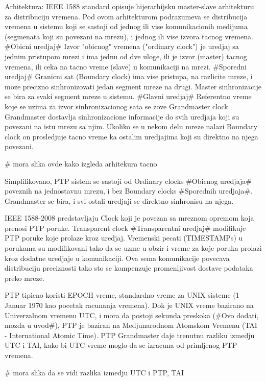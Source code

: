 \documentclass[a4paper,12pt, master]{etf}
\begin{document}
	Arhitektura:
	IEEE 1588 standard opisuje hijerarhijsku master-slave arhitekturu za distribuciju vremena. 
	Pod	ovom arhitekturom podrazumeva se distribucija vremena u sistemu koji se sastoji od 
	jednog ili vise komunikacionih medijuma (segmenata koji su povezani na mrezu), i jednog 
	ili vise izvora	tacnog vremena. \#Obicni uredjaj\# Izvor "obicnog" vremena ("ordinary 
	clock") je uredjaj sa jednim pristupom mrezi i ima jednu od dve uloge, ili je izvor  
	(master) tacnog vremena, ili ceka na tacno vreme (slave) u komunikaciji na mrezi. 
	\#Sporedni uredjaj\# Granicni sat (Boundary	clock) ima vise pristupa, na razlicite mreze, 
	i moze precizno sinhronizovati jedan segment mreze na drugi. Master sinhronizacije se bira 
	za svaki segment mreze u sistemu. \#Glavni	uredjaj\# Referentno vreme koje se uzima za 
	izvor sinhronizacionog sata se zove Grandmaster	clock. Grandmaster dostavlja 
	sinhronizacione informacije do svih uredjaja koji su povezani na istu mrezu sa njim. 
	Ukoliko se u nekom delu mreze nalazi Boundary clock on prosledjuje tacno vreme ka ostalim 
	uredjajima koji su direktno na njega povezani.

	\# mora slika ovde kako izgleda arhitekura tacno

	Simplifikovano, PTP sistem se sastoji od Ordinary clocks \#Obicnog uredjaja\# poveznih na
	jednostavnu mrezu, i bez Boundary clocks \#Sporednih uredjaja\#. Grandmaster se bira, i svi
	ostali uredjaji se direktno sinhronisu na njega.

	IEEE 1588-2008 predstavljaju Clock koji je povezan sa mreznom opremom koja prenosi PTP 
	poruke.	Transparent clock \#Transparentni uredjaj\# modifikuje PTP poruke koje prolaze 
	kroz uredjaj. Vremenski pecati (TIMESTAMPs) u porukama su modifikovani tako da se uzme u 
	obzir i vreme za koje poruka prolazi kroz dodatne uredjaje u komunikaciji. Ova sema 
	komunikacije povecava distribuciju preciznosti tako sto se kompenzuje promenljivost 
	dostave podataka preko mreze.

	PTP tipicno koristi EPOCH vreme, standardno vreme za UNIX sisteme (1 Januar 1970 kao 
	pocetak	racunanja vremena). Dok je UNIX vreme bazirano na Univerzalnom vremenu UTC, i mora 
	da postoji sekunda preskoka (\#Ovo dodati, mozda u uvod\#), PTP je baziran na 
	Medjunarodnom Atomskom Vremenu (TAI - International Atomic Time). PTP Grandmaster daje 
	trenutnu razliku izmedju UTC i TAI,	kako bi UTC vreme moglo da se izracuna od primljenog 
	PTP vremena.

	\# mora slika da se vidi razlika izmedju UTC i PTP, TAI
\end{document}
